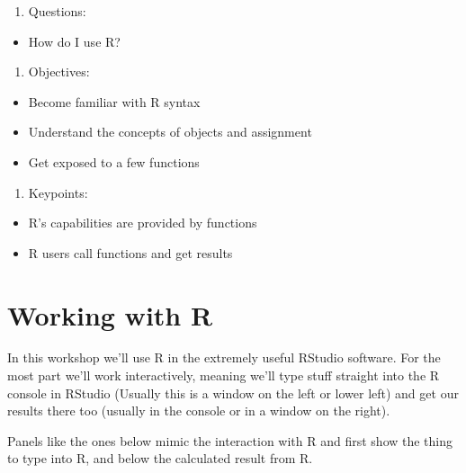 \documentclass[
]{book}
\providecommand{\tightlist}{%
  \setlength{\itemsep}{0pt}\setlength{\parskip}{0pt}}
\begin{document}
\begin{enumerate}
\def\labelenumi{\arabic{enumi}.}
\tightlist
\item
  Questions:
\end{enumerate}

\begin{itemize}
\tightlist
\item
  How do I use R?
\end{itemize}

\begin{enumerate}
\def\labelenumi{\arabic{enumi}.}
\setcounter{enumi}{1}
\tightlist
\item
  Objectives:
\end{enumerate}

\begin{itemize}
\tightlist
\item
  Become familiar with R syntax
\item
  Understand the concepts of objects and assignment
\item
  Get exposed to a few functions
\end{itemize}

\begin{enumerate}
\def\labelenumi{\arabic{enumi}.}
\setcounter{enumi}{2}
\tightlist
\item
  Keypoints:
\end{enumerate}

\begin{itemize}
\tightlist
\item
  R's capabilities are provided by functions
\item
  R users call functions and get results
\end{itemize}

\hypertarget{working-with-r}{%
\section{Working with R}\label{working-with-r}}

In this workshop we'll use R in the extremely useful RStudio software. For the most part we'll work interactively, meaning we'll type stuff straight into the R console in RStudio (Usually this is a window on the left or lower left) and get our results there too (usually in the console or in a window on the right).

Panels like the ones below mimic the interaction with R and first show the thing to type into R, and below the calculated result from R.
\end{document}
